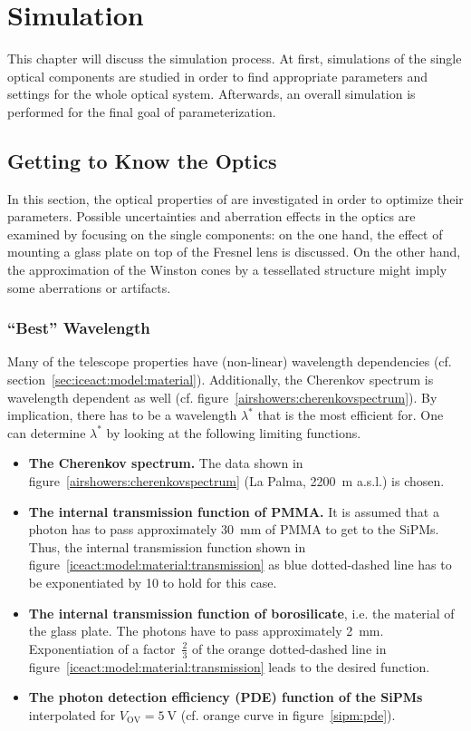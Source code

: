 \chapter{\iceact Simulation}\label{chap:iceact_sim}

This chapter will discuss the \geant simulation process. At first, simulations of the single optical components are studied in order to find appropriate parameters and settings for the whole optical system. Afterwards, an overall simulation is performed for the final goal of \iceact parameterization.

\section{Getting to Know the \iceact Optics}

In this section, the optical properties of \iceact are investigated in order to optimize their parameters. Possible uncertainties and aberration effects in the \iceact optics are examined by focusing on the single components: on the one hand, the effect of mounting a glass plate on top of the Fresnel lens is discussed. On the other hand, the approximation of the Winston cones by a tessellated structure might imply some aberrations or artifacts. 

\subsection{\enquote{Best} Wavelength}\label{sec:best_wvl}

Many of the \iceact telescope properties have (non-linear) wavelength dependencies (cf. section~\ref{sec:iceact:model:material}). Additionally, the Cherenkov spectrum is wavelength dependent as well (cf. figure~\ref{airshowers:cherenkovspectrum}). By implication, there has to be a wavelength $\lambda^\ast$ that \iceact is the most efficient for. One can determine $\lambda^\ast$ by looking at the following limiting functions.

\begin{itemize}
	\item \textbf{The Cherenkov spectrum.} The data shown in figure~\ref{airshowers:cherenkovspectrum} (La Palma, \SI{2200}{\meter} a.s.l.) is chosen.
	\item \textbf{The internal transmission function of PMMA.} It is assumed that a photon has to pass approximately \SI{30}{\milli\meter} of PMMA to get to the SiPMs. Thus, the internal transmission function shown in figure~\ref{iceact:model:material:transmission} as blue dotted-dashed line has to be exponentiated by \num{10} to hold for this case.
	\item \textbf{The internal transmission function of borosilicate}, i.e. the material of the glass plate. The photons have to pass approximately \SI{2}{\milli\meter}. Exponentiation of a factor~$\frac{2}{3}$ of the orange dotted-dashed line in figure~\ref{iceact:model:material:transmission} leads to the desired function.
	\item \textbf{The photon detection efficiency (PDE) function of the SiPMs} interpolated for $V_\text{OV} = \SI{5}{\volt}$ (cf. orange curve in figure~\ref{sipm:pde}).
\end{itemize}

